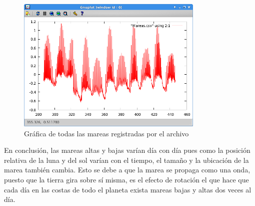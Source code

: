\documentclass[12pt]{article}
\begin{document}
 \begin{figure}[H]
 \includegraphics{General}
 \centering
 \caption{Gráfica de todas las mareas registradas por el archivo }
 \end{figure}
 
 En conclusión, las mareas altas y bajas varían día con día pues como la posición relativa de la luna y del sol varían con el tiempo, el tamaño y la ubicación de la marea también cambia. Esto se debe a que la marea se propaga como una onda, puesto que la tierra gira sobre sí misma, es el efecto de rotación el que hace que cada día en las costas de todo el planeta exista mareas bajas y altas dos veces al día. 
\end{document}

